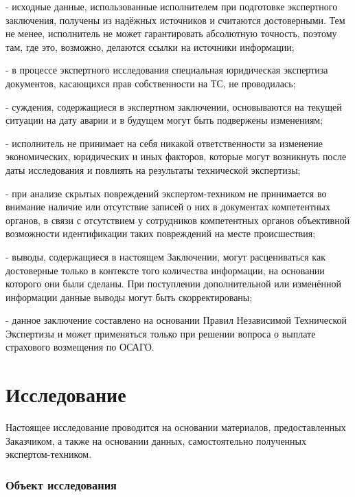\noindent - исходные данные, использованные исполнителем при подготовке экспертного заключения, получены из надёжных источников и считаются достоверными. Тем не менее, исполнитель не может гарантировать абсолютную точность, поэтому там, где это, возможно, делаются ссылки на источники информации;

\noindent - в процессе экспертного исследования специальная юридическая экспертиза документов, касающихся прав собственности на ТС, не проводилась;

\noindent - суждения, содержащиеся в экспертном заключении, основываются на текущей ситуации на дату аварии и в будущем могут быть подвержены изменениям;

\noindent - исполнитель не принимает на себя никакой ответственности за изменение экономических, юридических и иных факторов, которые могут возникнуть после даты исследования и повлиять на результаты технической экспертизы;

\noindent - при анализе скрытых повреждений экспертом-техником не принимается во внимание наличие или отсутствие записей о них в документах компетентных органов, в связи с отсутствием у сотрудников компетентных органов объективной возможности  идентификации таких повреждений на месте происшествия;


\noindent - выводы, содержащиеся в настоящем Заключении, могут расцениваться как достоверные только в контексте того количества информации, на основании которого они были сделаны. При поступлении дополнительной или изменённой информации данные выводы могут быть
скорректированы; 

\noindent - данное заключение составлено на основании Правил Независимой Технической Экспертизы и может применяться только при решении вопроса о выплате страхового возмещения по ОСАГО.


\section{Исследование}

Настоящее исследование проводится на основании материалов, предоставленных Заказчиком, а также на основании данных, самостоятельно полученных экспертом-техником.

\subsubsection{Объект исследования}

